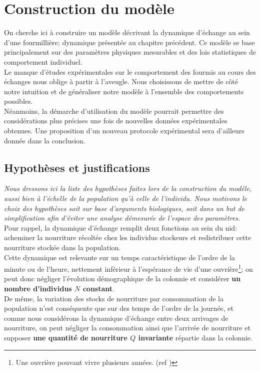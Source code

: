 \chapter{Construction du modèle}

On cherche ici à construire un modèle décrivant la dynamique d'échange au sein d'une fourmillière; dynamique présentée au chapitre précédent. Ce modèle se base principalement sur des paramètres physiques mesurables et des lois statistiques de comportement individuel. \\

Le manque d'études expérimentales sur le comportement des fourmis au cours des échanges nous oblige à partir à l'aveugle. Nous choisissons de mettre de côté notre intuition et de généraliser notre modèle à l'ensemble des comportements possibles.\\

Néanmoins, la démarche d'utilisation du modèle pourrait permettre des considérations plus précises une fois de nouvelles données expérimentales obtenues. Une proposition d'un nouveau protocole expérimental sera d'ailleurs donnée dans la conclusion.


\section{Hypothèses et justifications}
\textit{Nous dressons ici la liste des hypothèses faites lors de la construction du modèle, aussi bien à l'échelle de la population qu'à celle de l'individu. Nous motivons le choix des hypothèses soit sur base d'arguments biologiques, soit dans un but de simplification afin d'éviter une analyse démesurée de l'espace des paramètres.}\\

Pour rappel, la dynamique d'échange remplit deux fonctions au sein du nid: acheminer la nourriture récoltée chez les individus stockeurs et redistribuer cette nourriture stockée dans la population. \\

Cette dynamique est relevante sur un temps caractéristique de l'ordre de la minute ou de l'heure, nettement inférieur à l'espérance de vie d'une ouvrière\footnote{Une ouvrière pouvant vivre plusieurs années. (ref \fixme)}; on peut donc négliger l'évolution démographique de la colonnie et considérer \textbf{un nombre d'individus $N$ constant}.\\

De même, la variation des stocks de nourriture par consommation de la population n'est conséquente que sur des temps de l'ordre de la journée, et comme nous considérons la dynamique d'échange entre deux arrivages de nourriture, on peut négliger la consommation ainsi que l'arrivée de nourriture et supposer \textbf{une quantité de nourriture $Q$ invariante} répartie dans la colonnie.\\


